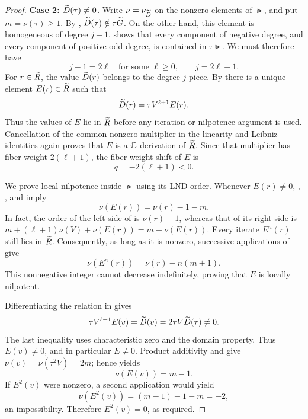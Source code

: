 \begin{proof}
\medskip
\noindent\textbf{Case 2: $\widetilde D(\tau)\ne0$.}
Write $\nu=\nu_{\widetilde D}$ on the nonzero elements of $\Gt$, and put
$m=\nu(\tau)\ge1$.  By ,
$\widetilde D(\tau)\notin\tau\widetilde G$.  On the other hand, this element is
homogeneous of degree $j-1$.   shows that
every component of negative degree, and every component of positive
odd degree, is contained in $\tau\Gt$.  We must therefore have
\begin{equation}\label{red:odd-shift}
  j-1=2\ell\quad\text{for some }\ell\ge0,
  \qquad j=2\ell+1.
\end{equation}
For $r\in\widetilde R$, the value $\widetilde D(r)$ belongs to the degree-$j$ piece.
By  there is a unique element $E(r)\in\widetilde R$ such that
\begin{equation}\label{red:moving-tau}
  \widetilde D(r)=\tau V^{\ell+1}E(r).
\end{equation}
Thus the values of $E$ lie in $\widetilde R$ before any iteration or nilpotence
argument is used.  Cancellation of the common nonzero multiplier in
the linearity and Leibniz identities again proves that $E$ is a
$\mathbb C$-derivation of $\widetilde R$.  Since that multiplier has fiber weight
$2(\ell+1)$, the fiber weight shift of $E$ is
\begin{equation}\label{red:negative-weight}
  q=-2(\ell+1)<0.
\end{equation}

We prove local nilpotence inside $\Gt$ using its LND order.  Whenever
$E(r)\ne0$, , , and
 imply
\begin{equation}\label{red:order-decrease}
  \nu(E(r))=\nu(r)-1-m.
\end{equation}
In fact, the order of the left side of  is
$\nu(r)-1$, whereas that of its right side is
$m+(\ell+1)\nu(V)+\nu(E(r))=m+\nu(E(r))$.
Every iterate $E^n(r)$ still lies in $\widetilde R$.  Consequently, as long as
it is nonzero, successive applications of 
give
\[
  \nu(E^n(r))=\nu(r)-n(m+1).
\]
This nonnegative integer cannot decrease indefinitely, proving that
$E$ is locally nilpotent.

Differentiating the relation in  gives
\begin{equation}\label{red:moving-v}
  \tau V^{\ell+1}E(v)=\widetilde D(v)=2\tau V\widetilde D(\tau)\ne0.
\end{equation}
The last inequality uses characteristic zero and the domain property.
Thus $E(v)\ne0$, and in particular $E\ne0$.
Product additivity and  give
$\nu(v)=\nu(\tau^2V)=2m$; hence  yields
\[
  \nu(E(v))=m-1.
\]
If $E^2(v)$ were nonzero, a second application would yield
\[
  \nu(E^2(v))=(m-1)-1-m=-2,
\]
an impossibility.  Therefore $E^2(v)=0$, as required.
\end{proof}

